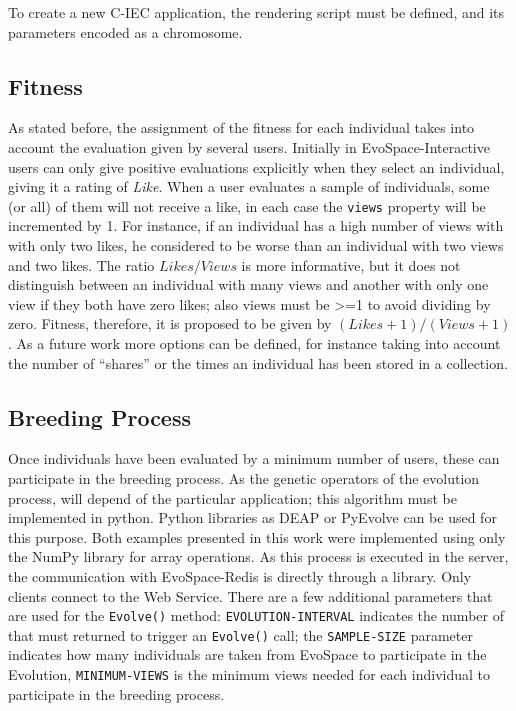 \documentclass{sig-alternate}
\begin{document}
To create a new C-IEC application, the  rendering script must be defined, and its parameters encoded as a chromosome.    


\subsection{Fitness}
As stated before, the assignment of the fitness for each individual takes into account the evaluation given by several users. Initially in EvoSpace-Interactive users can only give positive evaluations explicitly when they select an individual, giving it a rating of \emph{Like}.
When a user evaluates a sample of individuals, some (or all) of them will not receive a like, in each case the \texttt{views} property will be incremented by 1. For instance, if an individual has a high number of views with with only two likes, he considered to be  worse than an individual with two views and two likes. The ratio $Likes/Views$ is more informative, but it does not distinguish between an individual with many views and another with only
one view if they both have zero likes; also views must be >=1 to avoid dividing by zero. Fitness, therefore, it is proposed to be given by $(Likes+1)/(Views+1)$. As a future work more options can be defined, for instance taking into account the number of ``shares'' or the times an individual has been stored in a collection. 

\subsection{Breeding Process}

Once individuals have been evaluated by a minimum number of users, these can participate in the breeding process. As the genetic operators of the evolution process, will depend of the particular application; this algorithm must be implemented in python. Python libraries as DEAP or PyEvolve can be used for this purpose. Both examples presented in this work were implemented using only the NumPy library for array operations. As this process is executed in the server, the communication with EvoSpace-Redis is directly through a library. Only clients connect to the Web Service. There are a few additional parameters that are used for the \texttt{Evolve()} method: \texttt{EVOLUTION-INTERVAL} indicates the number of that must returned to trigger an \texttt{Evolve()} call; the  \texttt{SAMPLE-SIZE} parameter indicates how many individuals are taken from EvoSpace to participate in the Evolution, \texttt{MINIMUM-VIEWS} is the minimum views needed for each individual to participate in the breeding process.
\end{document}
